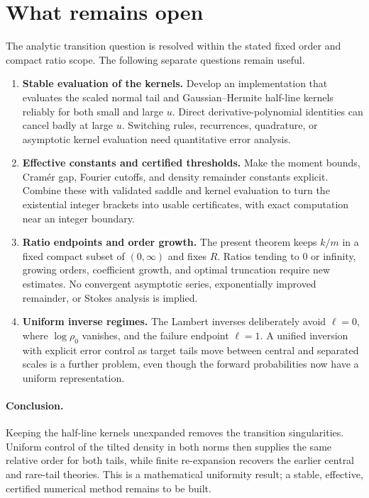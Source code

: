 \documentclass[11pt]{article}
\numberwithin{equation}{section}
\theoremstyle{remark}\newtheorem{remark}[theorem]{Remark}
\begin{document}
\section{What remains open}\label{brs:un:sec:open}

The analytic transition question is resolved within the stated fixed
order and compact ratio scope.  The following separate questions
remain useful.
\begin{enumerate}[leftmargin=*,itemsep=0.55em]
\item \textbf{Stable evaluation of the kernels.}
Develop an implementation that evaluates the scaled normal tail and
Gaussian--Hermite half-line kernels reliably for both small and large
$u$.  Direct derivative-polynomial identities can cancel badly at
large $u$.  Switching rules, recurrences, quadrature, or asymptotic
kernel evaluation need quantitative error analysis.
\item \textbf{Effective constants and certified thresholds.}
Make the moment bounds, Cram\'er gap, Fourier cutoffs, and density
remainder constants explicit.  Combine these with validated saddle
and kernel evaluation to turn the existential integer brackets into
usable certificates, with exact computation near an integer boundary.
\item \textbf{Ratio endpoints and order growth.}
The present theorem keeps $k/m$ in a fixed compact subset of
$(0,\infty)$ and fixes $R$.  Ratios tending to $0$ or infinity, growing
orders, coefficient growth, and optimal truncation require new
estimates.  No convergent asymptotic series, exponentially improved
remainder, or Stokes analysis is implied.
\item \textbf{Uniform inverse regimes.}
The Lambert inverses deliberately avoid $\ell=0$, where
$\log\rho_0$ vanishes, and the failure endpoint $\ell=1$.
A unified inversion with explicit error control as target tails move
between central and separated scales is a further problem, even
though the forward probabilities now have a uniform representation.
\end{enumerate}

\paragraph{Conclusion.}
Keeping the half-line kernels unexpanded removes the transition
singularities.  Uniform control of the tilted density in both norms
then supplies the same relative order for both tails, while finite
re-expansion recovers the earlier central and rare-tail theories.
This is a mathematical uniformity result; a stable, effective,
certified numerical method remains to be built.
\end{document}
